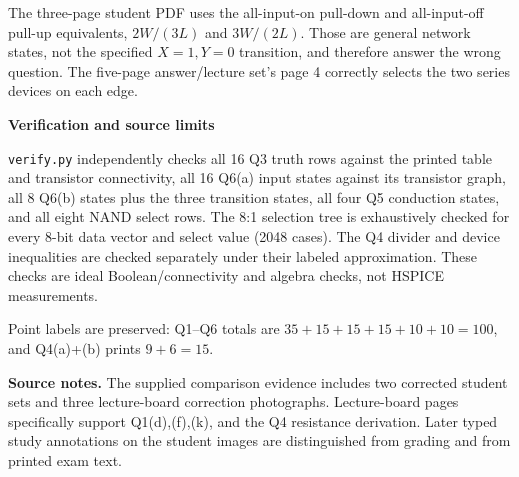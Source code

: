 \documentclass[10pt]{article}
\begin{document}
The three-page student PDF uses the all-input-on pull-down and all-input-off pull-up equivalents, $2W/(3L)$ and $3W/(2L)$. Those are general network states, not the specified $X=1,Y=0$ transition, and therefore answer the wrong question. The five-page answer/lecture set's page 4 correctly selects the two series devices on each edge.

\textbf{Verification and source limits}

\texttt{verify.py} independently checks all 16 Q3 truth rows against the printed table and transistor connectivity, all 16 Q6(a) input states against its transistor graph, all 8 Q6(b) states plus the three transition states, all four Q5 conduction states, and all eight NAND select rows. The 8:1 selection tree is exhaustively checked for every 8-bit data vector and select value (2048 cases). The Q4 divider and device inequalities are checked separately under their labeled approximation. These checks are ideal Boolean/connectivity and algebra checks, not HSPICE measurements.

Point labels are preserved: Q1--Q6 totals are $35+15+15+15+10+10=100$, and Q4(a)+(b) prints $9+6=15$.

\textbf{Source notes.} The supplied comparison evidence includes two corrected student sets and three lecture-board correction photographs. Lecture-board pages specifically support Q1(d),(f),(k), and the Q4 resistance derivation. Later typed study annotations on the student images are distinguished from grading and from printed exam text.
\end{document}
